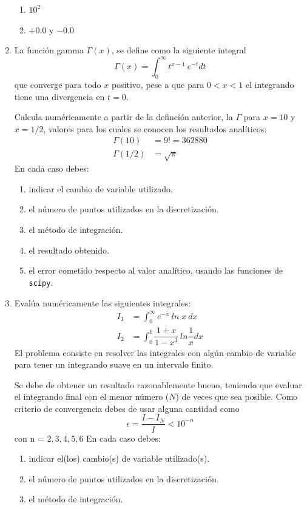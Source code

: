 \documentclass[11pt]{article}
\begin{document}
\begin{enumerate}
\begin{enumerate}
\item $10^{2}$
\item $+0.0$ y $-0.0$
\end{enumerate}
\item La función gamma $\Gamma (x)$, se define como la siguiente integral
\[ \Gamma (x) = \int_{0}^{\infty} t^{x-1} \: e^{-t} dt\]
que converge para todo $x$ positivo, pese a que para $0<x<1$ el integrando tiene una divergencia en $t=0$.
\par
Calcula numéricamente a partir de la definción anterior, la $\Gamma$ para $x = 10$ y $x = 1/2$, valores para los cuales se conocen los resultados analíticos:
\begin{align*}
\Gamma(10) &= 9! = 362880 \\
\Gamma(1/2) &= \sqrt{\pi}
\end{align*}
En cada caso debes:
\begin{enumerate}
\item indicar el cambio de variable utilizado.
\item el número de puntos utilizados en la discretización.
\item el método de integración.
\item el resultado obtenido.
\item el error cometido respecto al valor analítico, usando las funciones de \texttt{scipy}.
\end{enumerate}
\item Evalúa numéricamente las siguientes integrales:
\begin{align*}
I_{1} &= \int_{0}^{\infty} e^{-x} \:  ln \; x \: dx \\
I_{2} &= \int_{0}^{1} \dfrac{1+x}{1-x^{3}} \: ln\dfrac{1}{x} dx
\end{align*}
El problema consiste en resolver las integrales con algún cambio de variable para tener un integrando suave en un intervalo finito.
\par
Se debe de obtener un resultado razonablemente bueno, teniendo que evaluar el integrando final con el menor número ($N$) de veces que sea posible. Como criterio de convergencia debes de usar alguna cantidad como
\[ \epsilon = \dfrac{I - I_{N}}{I} < 10^{-n}\]
con n = $2,3,4,5,6$
En cada caso debes:
\begin{enumerate}
\item indicar el(los) cambio(s) de variable utilizado(s).
\item el número de puntos utilizados en la discretización.
\item el método de integración.

\end{enumerate}
\end{enumerate}
\end{document}
